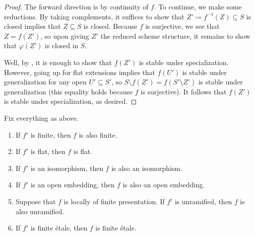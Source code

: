 \documentclass{amsart}
\begin{document}
\begin{proof}
    The forward direction is by continuity of $f$. To continue, we make some reductions. By taking complements, it suffices to show that $Z'\coloneqq f^{-1}(Z)\subseteq S$ is closed implies that $Z\subseteq S$ is closed. Because $f$ is surjective, we see that $Z=f(Z')$, so upon giving $Z'$ the reduced scheme structure, it remains to show that $\varphi(Z')$ is closed in $S$.
    
    Well, by \cite[Lemma~II.4.5]{hartshorne}, it is enough to show that $f(Z')$ is stable under specialization. However, going up for flat extensions \cite[Lemma~10.11]{eisenbud-comm-alg} implies that $f(U')$ is stable under generalization for any open $U'\subseteq S'$, so $S\setminus f(Z')=f(S'\setminus Z')$ is stable under generalization (this equality holds because $f$ is surjective). It follows that $f(Z')$ is stable under specialization, as desired.
\end{proof}
\begin{proposition} \label{prop:descent}
    Fix everything as above.
    \begin{enumerate}[label=(\alph*)]
        \item If $f'$ is finite, then $f$ is also finite.
        \item If $f'$ is flat, then $f$ is flat.
        \item If $f'$ is an isomorphism, then $f$ is also an isomorphism.
        \item If $f'$ is an open embedding, then $f$ is also an open embedding.
        \item Suppose that $f$ is locally of finite presentation. If $f'$ is unramified, then $f$ is also unramified.
        \item If $f'$ is finite \'etale, then $f$ is finite \'etale.
    \end{enumerate}
\end{proposition}
\end{document}
